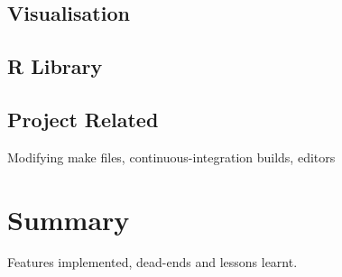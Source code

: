 \subsection{Visualisation}

\subsection{R Library}

\subsection{Project Related}
Modifying make files, continuous-integration builds, editors

\section{Summary}
Features implemented, dead-ends and lessons learnt.
